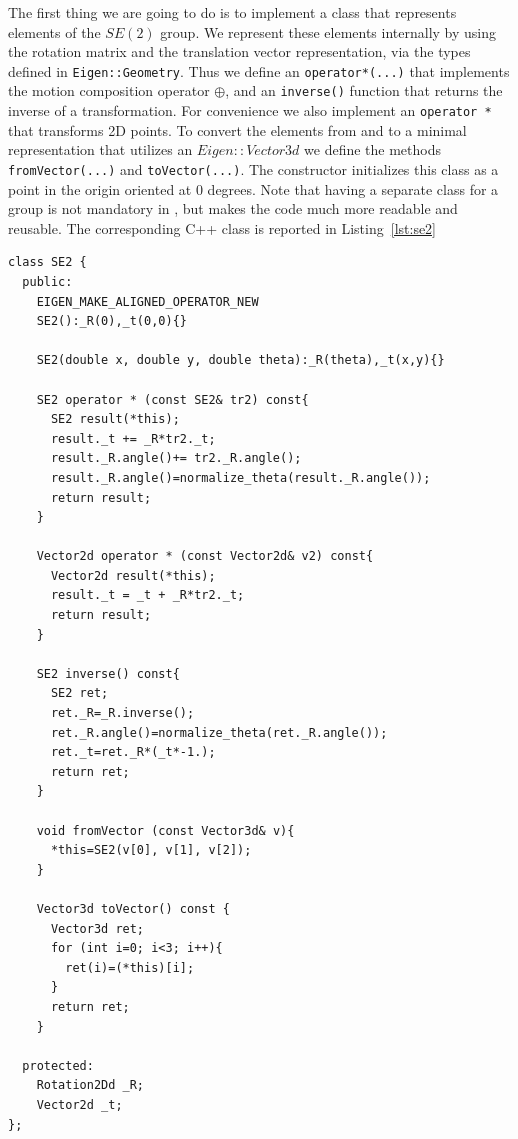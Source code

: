 \documentclass[a4paper]{article}
\begin{document}
The first thing we are going to do is to implement a class that
represents elements of the $SE(2)$ group. We represent these elements
internally by using the rotation matrix and the translation vector
representation, via the types defined in \verb+Eigen::Geometry+.  Thus
we define an \verb+operator*(...)+ that implements the motion composition
operator $\oplus$, and an \verb+inverse()+ function that returns the inverse of
a transformation. For convenience we also implement an
\verb+operator *+ that transforms 2D points. To convert the elements
from and to a minimal representation that utilizes an $Eigen::Vector3d$
we define the methods \verb+fromVector(...)+ and \verb+toVector(...)+.
The constructor initializes this class as a point in the origin
oriented at 0 degrees.  Note that having a separate class for a group
is not mandatory in \gopt, but makes the code much more readable and
reusable. The corresponding C++ class is reported in
Listing~\ref{lst:se2}
\begin{lstlisting}[float,label=lst:se2,caption=\text{Helper class to represent $SE(2)$}.]
class SE2 {
  public:
    EIGEN_MAKE_ALIGNED_OPERATOR_NEW
    SE2():_R(0),_t(0,0){}

    SE2(double x, double y, double theta):_R(theta),_t(x,y){}

    SE2 operator * (const SE2& tr2) const{
      SE2 result(*this);
      result._t += _R*tr2._t;
      result._R.angle()+= tr2._R.angle();
      result._R.angle()=normalize_theta(result._R.angle());
      return result;
    }

    Vector2d operator * (const Vector2d& v2) const{
      Vector2d result(*this);
      result._t = _t + _R*tr2._t;
      return result;
    }

    SE2 inverse() const{
      SE2 ret;
      ret._R=_R.inverse();
      ret._R.angle()=normalize_theta(ret._R.angle());
      ret._t=ret._R*(_t*-1.);
      return ret;
    }

    void fromVector (const Vector3d& v){
      *this=SE2(v[0], v[1], v[2]);
    }

    Vector3d toVector() const {
      Vector3d ret;
      for (int i=0; i<3; i++){
        ret(i)=(*this)[i];
      }
      return ret;
    }

  protected:
    Rotation2Dd _R;
    Vector2d _t;
};
\end{lstlisting}
\end{document}
